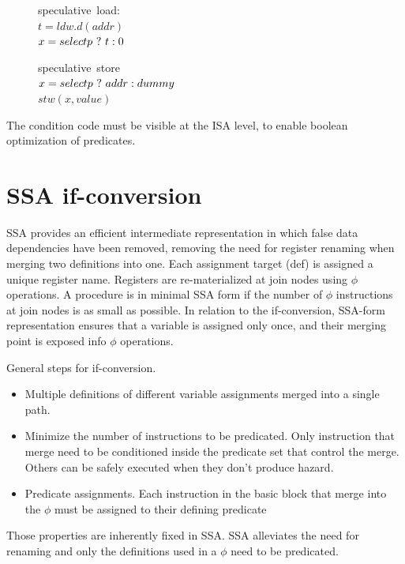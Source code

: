 \begin{figure}
\begin{minipage}[t]{4cm}
\mbox{speculative load:} \\
$t = ldw.d(addr) $ \\
$x = select p ~?~ t : 0 $ \\
\end{minipage}
\begin{minipage}[t]{4cm}
\mbox{speculative store} \\
$x=select p ~?~ addr : dummy $ \\
$stw (x, value) $
\end{minipage}
\label{fig:spec}
\end{figure}

The condition code must be visible at the ISA level, to enable boolean optimization of predicates.

\section{SSA if-conversion}

SSA provides an efficient intermediate representation in which false data dependencies have been removed, removing the need for register renaming when merging two definitions into one. Each assignment target (def) is assigned a unique register name. Registers are re-materialized at join nodes using $\phi$ operations. A procedure is in minimal SSA form if the number of $\phi$ instructions at join nodes is as small as possible. In relation to the if-conversion, SSA-form representation ensures that a variable is assigned only once, and their merging point is exposed info $\phi$ operations.

General steps for if-conversion.

\begin{itemize}
\item Multiple definitions of different variable assignments merged into a single path. 
\item Minimize the number of instructions to be predicated. Only instruction that merge need to be conditioned inside the predicate set that control the merge. Others can be safely executed when they don't produce hazard. 
\item Predicate assignments. Each instruction in the basic block that merge into the $\phi$ must be assigned to their defining predicate
\end {itemize}

Those properties are inherently fixed in SSA. SSA alleviates the need for renaming and only the definitions used in a $\phi$ need to be predicated. 

